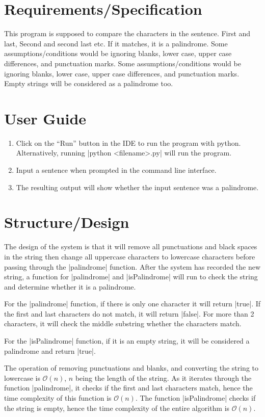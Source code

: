 \documentclass{report}
\begin{document}
\section{Requirements/Specification}
This program is supposed to compare the characters in the sentence. First and last, Second and second last etc. If it matches, it is a palindrome. Some assumptions/conditions would be ignoring blanks, lower case, upper case differences, and punctuation marks. Some assumptions/conditions would be ignoring blanks, lower case, upper case differences, and punctuation marks. Empty strings will be considered as a palindrome too.
\section{User Guide}
\begin{enumerate}
	\item Click on the ``Run'' button in the IDE to run the program with python. Alternatively, running |python <filename>.py| will run the program.
	\item Input a sentence when prompted in the command line interface.
	\item The resulting output will show whether the input sentence was a palindrome.
\end{enumerate}
\section{Structure/Design}
The design of the system is that it will remove all punctuations and black spaces in the string then change all uppercase characters to lowercase characters before passing through the |palindrome| function. After the system has recorded the new string, a function for |palindrome| and |isPalindrome| will run to check the string and determine whether it is a palindrome.

For the |palindrome| function, if there is only one character it will return |true|. If the first and last characters do not match, it will return |false|. For more than 2 characters, it will check the middle substring whether the characters match.

For the |isPalindrome| function, if it is an empty string, it will be considered a palindrome and return |true|.

The operation of removing punctuations and blanks, and converting the string to lowercase is \(\mathcal{O}(n)\), \(n\) being the length of the string. As it iterates through the function |palindrome|, it checks if the first and last characters match, hence the time complexity of this function is \(\mathcal{O}(n)\). The function |isPalindrome| checks if the string is empty, hence the time complexity of the entire algorithm is \(\mathcal{O}(n)\).
\end{document}
